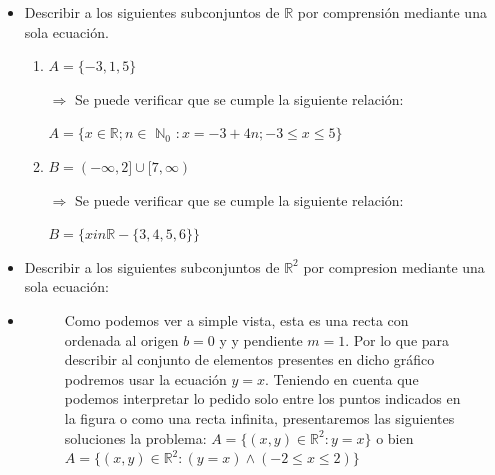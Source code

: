 \documentclass[10pt]{article}
\begin{document}
\begin{ej}

\begin{itemize}
\item[i)] Describir a los siguientes subconjuntos de $\mathbb{R}$ por comprensión mediante una sola ecuación.
\begin{enumerate}
\item $A=\{-3,1,5\}$

 $\Rightarrow$ Se puede verificar que se cumple la siguiente relación: 

$A=\{x \in \mathbb{R};  n \in$ $\mathbb{N}_0$ $: x=-3+4n; -3 \leq x \leq 5\}$

\item $B=(-\infty,2] \cup [7,\infty)$ 

$\Rightarrow$ Se puede verificar que se cumple la siguiente relación:
 
 $B=\{x in \mathbb{R} - \{3,4,5,6\}\}$
\end{enumerate}

\item[ii)] Describir a los siguientes subconjuntos de $\mathbb{R}^2$ por compresion mediante una sola ecuación:
\item[i)]

\usetikzlibrary {backgrounds}

\begin{figure}[H]
\begin{minipage}[b]{0.5\linewidth}
		\centering
{}
\end{minipage} 
\begin{minipage}[b]{0.5\linewidth}
		\centering
		\sffamily Como podemos ver a simple vista, esta es una recta con ordenada al origen  $b=0$ y y pendiente $m=1$. Por lo que para describir al conjunto de elementos presentes en dicho gráfico podremos usar la ecuación \textcolor{B}{$y = x$}. Teniendo en cuenta que podemos interpretar lo pedido solo entre los puntos indicados en la figura o como una recta infinita, presentaremos las siguientes soluciones la problema: 
$A=\{(x,y) \in \mathbb{R}^2 : y=x \}$ o bien $A=\{(x,y) \in \mathbb{R}^2 : (y=x) \land( -2 \leq x \leq 2) \}$ 
\end{minipage}
\end{figure}


\end{itemize}
\end{ej}
\end{document}
